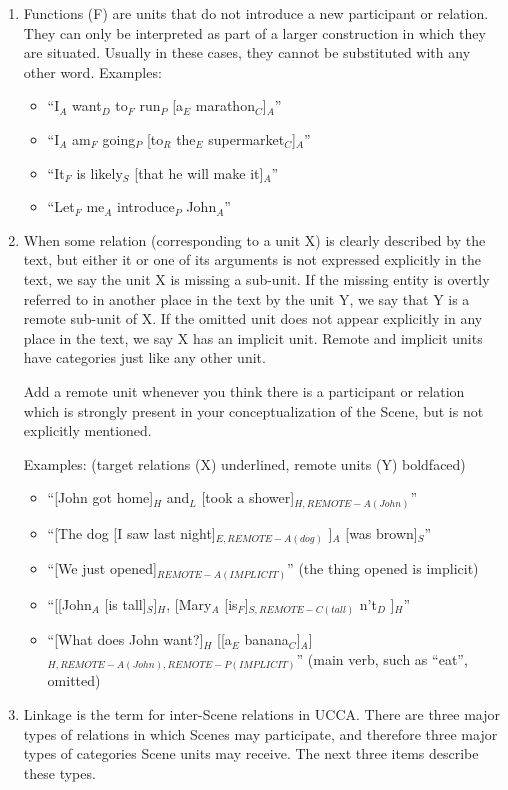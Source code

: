 \documentclass[11pt]{article}
\begin{document}
\begin{enumerate}
\item
Functions (F) are units that do not introduce a new participant or relation. They can only be interpreted as part of a larger construction in which they are situated. Usually in these cases, they cannot be substituted with any other word.
Examples:
\begin{itemize}
\item
``I$_A$ want$_D$ to$_F$ run$_P$ [a$_E$ marathon$_C$]$_A$''
\item
``I$_A$ am$_F$ going$_P$ [to$_R$ the$_E$ supermarket$_C$]$_A$''
\item
``It$_F$ is likely$_S$ [that he will make it]$_A$''
\item
``Let$_F$ me$_A$ introduce$_P$ John$_A$''
\end{itemize}

\item
When some relation (corresponding to a unit X) is clearly described by the text, but either it or one of its arguments is not expressed explicitly in the text, we say the unit X is missing a sub-unit. If the missing entity is overtly referred to in another place in the text by the unit Y, we say that Y is a remote sub-unit of X. If the omitted unit does not appear explicitly in any place in the text, we say X has an implicit unit. Remote and implicit units have categories just like any other unit.

Add a remote unit whenever you think there is a participant or relation which is strongly present in your conceptualization of the Scene, but is not explicitly mentioned.

Examples: (target relations (X) underlined, remote units (Y) boldfaced)

\begin{itemize}
\item	``[John got home]$_H$ and$_L$ [took a shower]$_{H,REMOTE-A(John)}$''
\item	``[The dog [I saw last night]$_{E,REMOTE-A(dog)}$ ]$_A$ [was brown]$_S$''
\item 	``[We just opened]$_{REMOTE-A(IMPLICIT)}$'' (the thing opened is implicit)
\item   ``[[John$_A$ [is tall]$_S$]$_H$, [Mary$_A$ [is$_F$]$_{S,REMOTE-C(tall)}$ n't$_D$ ]$_H$''
\item	``[What does John want?]$_H$ [[a$_E$ banana$_C$]$_A$]$_{H,REMOTE-A(John),REMOTE-P(IMPLICIT)}$'' (main verb, such as ``eat'', omitted)
\end{itemize}

\item
Linkage is the term for inter-Scene relations in UCCA. There are three major
types of relations in which Scenes may participate, and therefore three major types of categories Scene units may receive. The next three items describe these types.


\end{enumerate}
\end{document}
